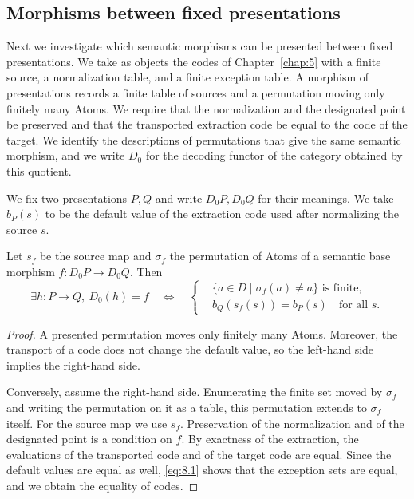 \subsection*{Morphisms between fixed presentations}

Next we investigate which semantic morphisms can be presented between fixed presentations.
We take as objects the codes of Chapter~\ref{chap:5} with a finite source, a normalization
table, and a finite exception table.
A morphism of presentations records a finite table of sources and a permutation moving only
finitely many Atoms.
We require that the normalization and the designated point be preserved and that the
transported extraction code be equal to the code of the target.
We identify the descriptions of permutations that give the same semantic morphism, and we
write $D_0$ for the decoding functor of the category obtained by this quotient.

We fix two presentations $P,Q$ and write $D_0P,D_0Q$ for their meanings.
We take $b_P(s)$ to be the default value of the extraction code used after normalizing the
source $s$.

\begin{proposition}\label{prop:8.3}

Let $s_f$ be the source map and $\sigma_f$ the permutation of Atoms of a semantic base
morphism $f:D_0P\to D_0Q$. Then
\begin{equation*}
\exists h:P\to Q,\ D_0(h)=f
\quad\Longleftrightarrow\quad
\left\{
\begin{aligned}
&\{a\in D\mid \sigma_f(a)\ne a\}\text{ is finite},\\
&b_Q(s_f(s))=b_P(s)\quad\text{for all }s.
\end{aligned}
\right.
\tag{8.3}\label{eq:8.3}
\end{equation*}

\end{proposition}

\begin{proof}

A presented permutation moves only finitely many Atoms.
Moreover, the transport of a code does not change the default value, so the left-hand side
implies the right-hand side.

Conversely, assume the right-hand side.
Enumerating the finite set moved by $\sigma_f$ and writing the permutation on it as a table,
this permutation extends to $\sigma_f$ itself.
For the source map we use $s_f$.
Preservation of the normalization and of the designated point is a condition on $f$.
By exactness of the extraction, the evaluations of the transported code and of the target
code are equal.
Since the default values are equal as well, \eqref{eq:8.1} shows that the exception sets are
equal, and we obtain the equality of codes.

\end{proof}

